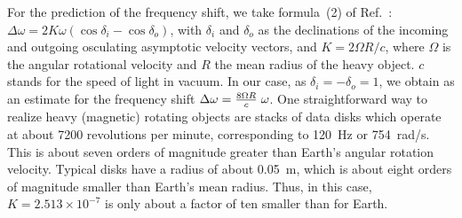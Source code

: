 \documentclass[prl,preprint,amsfonts,showpacs,showkeys]{revtex4}
\begin{document}

For the prediction of the frequency shift, we take formula~(2) of Ref.~\cite{anderson:091102}:
$
\Delta \omega = 2K\omega (\cos \delta_i -\cos \delta_o)
$,
with $\delta_i$ and $\delta_o$ as the declinations of the incoming and outgoing osculating asymptotic velocity vectors,
and $K= 2\Omega R /c$, where $\Omega$ is the angular rotational velocity and $R$ the mean radius of the heavy object. $c$ stands for the speed of light in vacuum.
In our case, as $\delta_i = -\delta_o = 1$, we obtain as an estimate for the frequency shift
$
\Delta \omega = {8\Omega R\over c}\;\omega
$.
One straightforward way to realize heavy (magnetic) rotating objects are stacks of data disks which operate at about 7200 revolutions per minute, corresponding to 120~Hz or 754~rad/s.
This is about seven orders of magnitude greater than Earth's angular rotation velocity.
Typical disks have a radius of about 0.05~m, which is about eight orders of magnitude smaller than Earth's mean radius.
Thus, in this case,
$
K= 2.513\times 10^{-7}
$
is only about a factor of ten smaller than for Earth.
\end{document}
